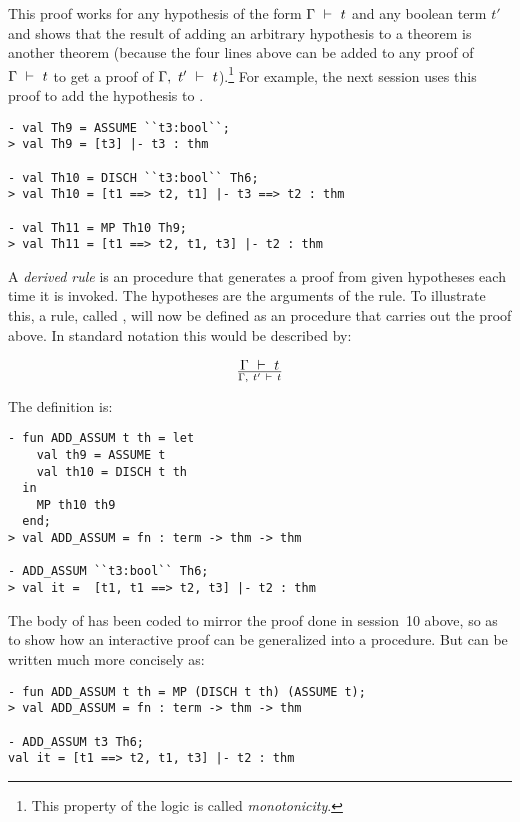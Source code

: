 \noindent This proof works for any hypothesis of the form $\Gamma\ \vdash\  t$
and any boolean term $t'$ and shows that the result of adding an
arbitrary hypothesis to a theorem is another theorem (because the four
lines above can be added to any proof of $\Gamma\ \vdash\  t$ to get a
proof of $\Gamma,\ t'\ \vdash\  t$).\footnote{This property of the logic is
  called {\it monotonicity}.} For example, the next session uses this
proof to add the hypothesis  to .

\begin{session}\begin{verbatim}
- val Th9 = ASSUME ``t3:bool``;
> val Th9 = [t3] |- t3 : thm

- val Th10 = DISCH ``t3:bool`` Th6;
> val Th10 = [t1 ==> t2, t1] |- t3 ==> t2 : thm

- val Th11 = MP Th10 Th9;
> val Th11 = [t1 ==> t2, t1, t3] |- t2 : thm
\end{verbatim}\end{session}


    A {\it derived rule\/} is an \ML{} procedure that generates a proof
    from given hypotheses each time it is invoked. The hypotheses are
    the arguments of the rule.  To illustrate this, a rule, called
    , will now be defined as an \ML{} procedure that
    carries out the proof above. In standard notation this would be
    described by:

\[ \Gamma\ \vdash\  t\over \Gamma,\ t'\ \vdash\  t \]

\noindent The \ML{} definition is:

\begin{session}\begin{verbatim}
- fun ADD_ASSUM t th = let
    val th9 = ASSUME t
    val th10 = DISCH t th
  in
    MP th10 th9
  end;
> val ADD_ASSUM = fn : term -> thm -> thm

- ADD_ASSUM ``t3:bool`` Th6;
> val it =  [t1, t1 ==> t2, t3] |- t2 : thm
\end{verbatim}\end{session}

\noindent The body of  has been coded  to mirror  the proof done
in session~10 above, so as to show how an interactive proof can be
generalized into a procedure.  But  can be written much
more concisely as:

\begin{session}\begin{verbatim}
- fun ADD_ASSUM t th = MP (DISCH t th) (ASSUME t);
> val ADD_ASSUM = fn : term -> thm -> thm

- ADD_ASSUM t3 Th6;
val it = [t1 ==> t2, t1, t3] |- t2 : thm
\end{verbatim}\end{session}


